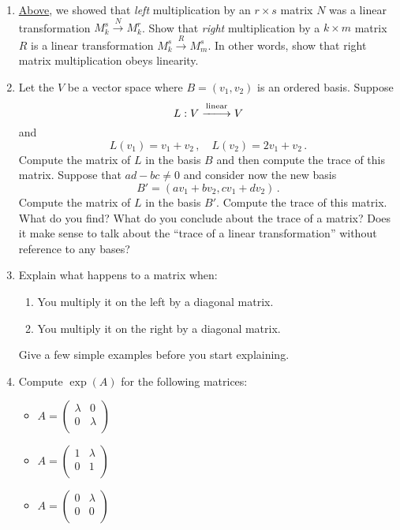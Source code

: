 \begin{enumerate}
\item \label{mat_prob} \hyperlink{leftmult}{Above}, we showed that \emph{left} multiplication by an $r \times s$ matrix $N$  was a linear transformation $M^s_k \stackrel{N}{\longrightarrow} M^r_k$.  Show that \emph{right} multiplication by a $k \times m$ matrix $R$ is a linear transformation $M^s_k \stackrel{R}{\longrightarrow} M^s_m$.  In other words, show that right matrix multiplication obeys linearity.



\item Let the $V$ be a vector space where $B=(v_1,v_2)$ is an ordered basis. Suppose
$$
L:V\stackrel{\rm linear}{-\!\!-\!\!\!\longrightarrow} V
$$
and $$L(v_1)=v_1+v_2 \, ,\quad L(v_2)=2v_1+v_2\, .$$ Compute the matrix of $L$ in the basis $B$ and then compute the trace of this matrix.
Suppose that $ad-bc\neq 0$ and consider now the new basis
$$
B'=(av_1+b v_2,cv_1+dv_2)\, .
$$
Compute the matrix of $L$ in the basis $B'$. Compute the trace of this matrix. What do you find? What do you conclude about the trace of a matrix? Does it make sense to talk about the ``trace of a linear transformation'' without reference to any bases? 

\item Explain what happens to a matrix when:
\begin{enumerate}
\item You multiply it on the left by a diagonal matrix.
\item You multiply it on the right by a diagonal matrix.
\end{enumerate}
Give a few simple examples before you start explaining.





\item  \label{expprob}Compute $\exp (A)$ for the following matrices:
\begin{itemize}
\item $A = \begin{pmatrix}
\lambda & 0 \\
0 & \lambda \\
\end{pmatrix}$
\item $A = \begin{pmatrix}
1 & \lambda \\
0 & 1 \\
\end{pmatrix}$
\item $A = \begin{pmatrix}
0 & \lambda \\
0 & 0 \\
\end{pmatrix}$
\end{itemize}


\end{enumerate}
